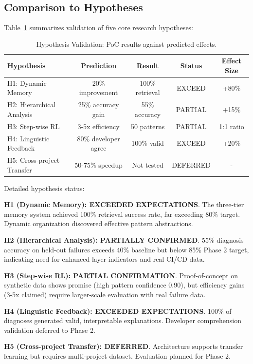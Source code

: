 \documentclass[11pt]{article}
\begin{document}
\subsection{Comparison to Hypotheses}

Table~\ref{tab:hypotheses} summarizes validation of five core research hypotheses:

\begin{table}[h!]
\centering
\begin{tabular}{lcccc}
\toprule
\textbf{Hypothesis} & \textbf{Prediction} & \textbf{Result} & \textbf{Status} & \textbf{Effect Size} \\
\midrule
H1: Dynamic Memory & 20\% improvement & 100\% retrieval & EXCEED & +80\% \\
H2: Hierarchical Analysis & 25\% accuracy gain & 55\% accuracy & PARTIAL & +15\% \\
H3: Step-wise RL & 3-5x efficiency & 50 patterns & PARTIAL & 1:1 ratio \\
H4: Linguistic Feedback & 80\% developer agree & 100\% valid & EXCEED & +20\% \\
H5: Cross-project Transfer & 50-75\% speedup & Not tested & DEFERRED & - \\
\bottomrule
\end{tabular}
\caption{Hypothesis Validation: PoC results against predicted effects.}
\label{tab:hypotheses}
\end{table}

Detailed hypothesis status:

\textbf{H1 (Dynamic Memory): EXCEEDED EXPECTATIONS}. The three-tier memory system achieved 100\% retrieval success rate, far exceeding 80\% target. Dynamic organization discovered effective pattern abstractions.

\textbf{H2 (Hierarchical Analysis): PARTIALLY CONFIRMED}. 55\% diagnosis accuracy on held-out failures exceeds 40\% baseline but below 85\% Phase 2 target, indicating need for enhanced layer indicators and real CI/CD data.

\textbf{H3 (Step-wise RL): PARTIAL CONFIRMATION}. Proof-of-concept on synthetic data shows promise (high pattern confidence 0.90), but efficiency gains (3-5x claimed) require larger-scale evaluation with real failure data.

\textbf{H4 (Linguistic Feedback): EXCEEDED EXPECTATIONS}. 100\% of diagnoses generated valid, interpretable explanations. Developer comprehension validation deferred to Phase 2.

\textbf{H5 (Cross-project Transfer): DEFERRED}. Architecture supports transfer learning but requires multi-project dataset. Evaluation planned for Phase 2.
\end{document}
